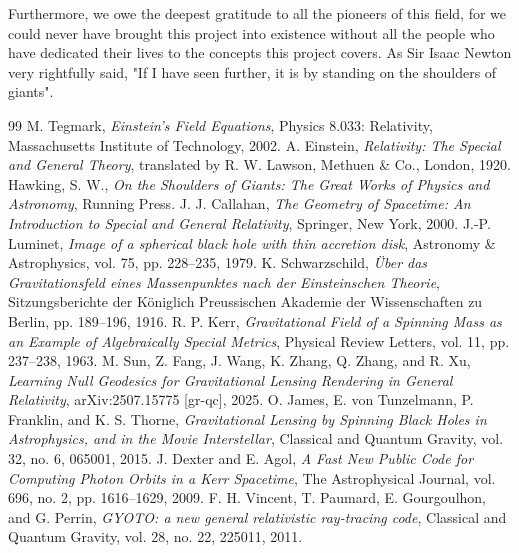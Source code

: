 \documentclass[12pt]{article}
\begin{document}
\begin{itemize}
Furthermore, we owe the deepest gratitude to all the pioneers of this field, for we could never have brought this project into existence without all the people who have dedicated their lives to the concepts this project covers. As {Sir Isaac Newton} very rightfully said, "If I have seen further, it is by standing on the shoulders of giants".
\newpage
\begin{thebibliography}{99}   
M. Tegmark,
\textit{Einstein's Field Equations},
Physics 8.033: Relativity,
Massachusetts Institute of Technology,
2002.
\cite{mitfieldeqs}
A. Einstein,
\textit{Relativity: The Special and General Theory},
translated by R. W. Lawson,
Methuen \& Co., London, 1920.
\cite{einstein1920}
Hawking, S. W., \textit{On the Shoulders of Giants:
The Great Works of Physics and Astronomy}, Running Press.
\cite{hawking2002}
J. J. Callahan,
\textit{The Geometry of Spacetime: An Introduction to Special and General Relativity},
Springer, New York, 2000.
\cite{callahan2000}
J.-P. Luminet,
\textit{Image of a spherical black hole with thin accretion disk},
Astronomy \& Astrophysics, vol. 75, pp. 228--235, 1979.
\cite{luminet1979}
K. Schwarzschild,
\textit{Über das Gravitationsfeld eines Massenpunktes nach der Einsteinschen Theorie},
Sitzungsberichte der Königlich Preussischen Akademie der Wissenschaften zu Berlin,
pp. 189--196, 1916.
\cite{schwarzschild1916}
R. P. Kerr,
\textit{Gravitational Field of a Spinning Mass as an Example of Algebraically Special Metrics},
Physical Review Letters, vol. 11, pp. 237--238, 1963.
\cite{kerr1963}
M. Sun, Z. Fang, J. Wang, K. Zhang, Q. Zhang, and R. Xu,
\textit{Learning Null Geodesics for Gravitational Lensing Rendering in General Relativity},
arXiv:2507.15775 [gr-qc], 2025.
\cite{sun2025}
O. James, E. von Tunzelmann, P. Franklin, and K. S. Thorne,
\textit{Gravitational Lensing by Spinning Black Holes in Astrophysics,
and in the Movie Interstellar},
Classical and Quantum Gravity, vol. 32, no. 6, 065001, 2015.
\cite{james2015}
J. Dexter and E. Agol,
\textit{A Fast New Public Code for Computing Photon Orbits in a Kerr Spacetime},
The Astrophysical Journal, vol. 696, no. 2, pp. 1616--1629, 2009.
\cite{dexter2009}
F. H. Vincent, T. Paumard, E. Gourgoulhon, and G. Perrin,
\textit{GYOTO: a new general relativistic ray-tracing code},
Classical and Quantum Gravity, vol. 28, no. 22, 225011, 2011.

\end{thebibliography}
\end{itemize}
\end{document}
